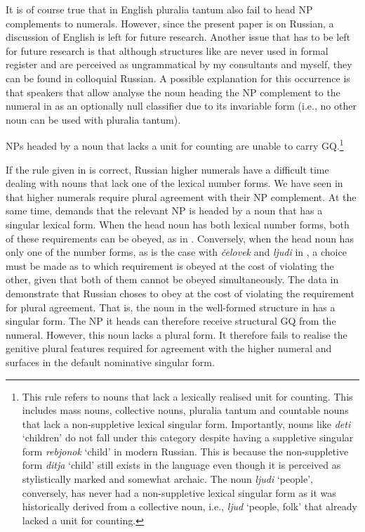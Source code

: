 \documentclass[output=paper,
modfonts,
newtxmath,
hidelinks
]{langscibook}
\begin{document}
{\begin{multicols}{2}
\end{multicols}

\noindent It is of course true that in English pluralia tantum also fail to head NP complements to numerals. However, since the present paper is on Russian, a discussion of English is left for future research. Another issue that has to be left for future research is that although structures like  are never used in formal register and are perceived as ungrammatical by my consultants and myself, they can be found in colloquial Russian. A possible explanation for this occurrence is that speakers that allow  analyse the noun heading the NP complement to the numeral in  as an optionally null classifier due to its invariable form (i.e., no other noun can be used with pluralia tantum).}

\ea \label{18:ex8} NPs headed by a noun that lacks a unit for counting are unable to carry GQ.\label{18:ex:key:8}\footnote{\label{18:fn5}This rule refers to nouns that lack a lexically realised unit for counting. This includes mass nouns, collective nouns, pluralia tantum and countable nouns that lack a non-suppletive lexical singular form. Importantly, nouns like \textit{deti} ‘children’ do not fall under this category despite having a suppletive singular form \textit{rebjonok} ‘child’ in modern Russian. This is because the non-suppletive form \textit{ditja} ‘child’ still exists in the language even though it is perceived as stylistically marked and somewhat archaic.  The noun \textit{ljudi} ‘people’, conversely, has never had a non-suppletive lexical singular form as it was historically derived from a collective noun, i.e., \textit{ljud} ‘people, folk’ \citep{Chumakina-etal2004} that already lacked a unit for counting.
}

    \z

\noindent If the rule given in  is correct, Russian higher numerals have a difficult time dealing with nouns that lack one of the lexical number forms. We have seen in  that higher numerals require plural agreement with their NP complement. At the same time,  demands that the relevant NP is headed by a noun that has a singular lexical form. When the head noun has both lexical number forms, both of these requirements can be obeyed, as in . Conversely, when the head noun has only one of the number forms, as is the case with \textit{čelovek} and \textit{ljudi} in , a choice must be made as to which requirement is obeyed at the cost of violating the other, given that both of them cannot be obeyed simultaneously. The data in  demonstrate that Russian choses to obey  at the cost of violating the requirement for plural agreement. That is, the noun in the well-formed structure in  has a singular form. The NP it heads can therefore receive structural GQ from the numeral. However, this noun lacks a plural form. It therefore fails to realise the genitive plural features required for agreement with the higher numeral and surfaces in the default nominative singular form.
\end{document}
